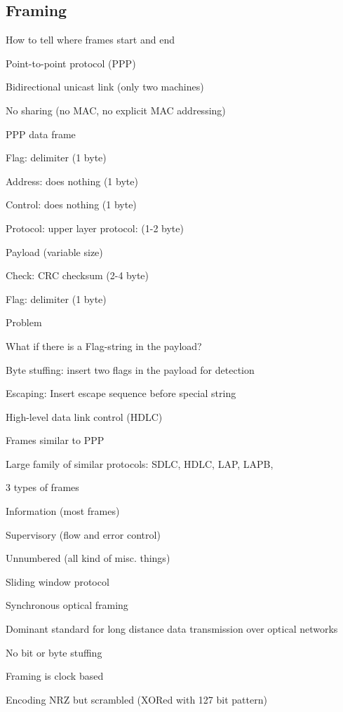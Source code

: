 \subsection{Framing}
\enumstart
	\item How to tell where frames start and end
	\item Point-to-point protocol (PPP)
	\enumstart
		\item Bidirectional unicast link (only two machines)
		\item No sharing (no MAC, no explicit MAC addressing)
		\item PPP data frame
		\enumstart
			\item Flag: delimiter (1 byte)
			\item Address: does nothing (1 byte)
			\item Control: does nothing (1 byte)
			\item Protocol: upper layer protocol: (1-2 byte)
			\item Payload (variable size)
			\item Check: CRC checksum (2-4 byte)
			\item Flag: delimiter (1 byte)
		\enumend
		\item Problem
		\enumstart
			\item What if there is a Flag-string in the payload? 
			\item Byte stuffing: insert two flags in the payload for detection
			\item Escaping: Insert escape sequence before special string
		\enumend
	\enumend
	\item High-level data link control (HDLC)
	\enumstart
		\item Frames similar to PPP
		\item Large family of similar protocols: SDLC, HDLC, LAP, LAPB, \ddd
		\item 3 types of frames
		\enumstart
			\item Information (most frames)
			\item Supervisory (flow and error control)
			\item Unnumbered (all kind of misc. things)
		\enumend
		\item Sliding window protocol
	\enumend
	\item Synchronous optical framing
	\enumstart
		\item Dominant standard for long distance data transmission over optical networks
		\item No bit or byte stuffing
		\item Framing is clock based
		\item Encoding NRZ but scrambled (XORed with 127 bit pattern)
	\enumend
\enumend

